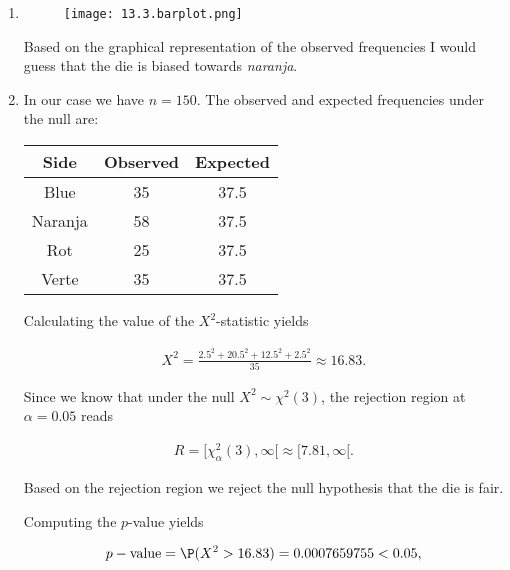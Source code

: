 
\begin{solution}

\phantom{}

\begin{enumerate}[label = (\alph*)]


    \item 

    \begin{figure}[H]
        \centering
        \texttt{[image: 13.3.barplot.png]}
    \end{figure}
    Based on the graphical representation of the observed frequencies
    I would guess that the die is biased towards \textit{naranja}.

    \item In our case we have $n = 150$. The observed and expected 
    frequencies under the null are:
    
    \begin{center}
    \begin{tabular}{c|c|c}
        Side & Observed & Expected \\
        \hline
        Blue & 35 & 37.5 \\
        Naranja & 58 & 37.5 \\
        Rot & 25 & 37.5 \\
        Verte & 35 & 37.5
    \end{tabular}
    \end{center}

    Calculating the value of the $X^2$-statistic yields

    \begin{align*}
        X^2 = \frac{2.5^2+20.5^2+12.5^2+2.5^2}{35} \approx 16.83.
    \end{align*}

    Since we know that under the null $X^2 \sim \chi^2(3)$,
    the rejection region at $\alpha = 0.05$ reads

    \begin{align*}
        R = [\chi^2_{\alpha}(3),\infty[ \approx [7.81,\infty[.
    \end{align*}

    Based on the rejection region we reject the null hypothesis that the die is fair.

    Computing the $p$-value yields

    \begin{align*}
        p-\text{value} = \P(X^2 > 16.83) = 0.0007659755 < 0.05,
    \end{align*}


\end{enumerate}
\end{solution}

